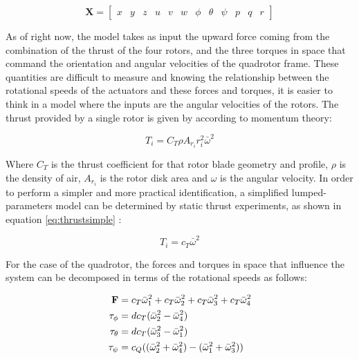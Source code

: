 \begin{equation} \label{eq:statevector}
\mathbf{X} = \begin{bmatrix} x & y & z & u & v & w & \phi & \theta & \psi & p & q & r \end{bmatrix}
\end{equation} 

As of right now, the model takes as input the upward force coming from the combination of the thrust of the four rotors, and the three torques in space that command the orientation and angular velocities of the quadrotor frame. These quantities are difficult to measure and knowing the relationship between the rotational speeds of the actuators and these forces and torques, it is easier to think in a model where the inputs are the angular velocities of the rotors. The thrust provided by a single rotor is given by \cite{MahoneyKumarCorke2012} according to momentum theory:

\begin{equation} \label{eq:rotorthrust}
T_i = C_T\rho A_{r_{i}}r_{i}^2 \bar{\omega}^2
\end{equation}	

Where $C_T$ is the thrust coefficient for that rotor blade geometry and profile, $\rho$ is the density of air, $A_{r_{i}}$ is the rotor disk area and $\omega$ is the angular velocity. In order to perform a simpler and more practical identification, a simplified lumped-parameters model can be determined by static thrust experiments, as shown in equation \ref{eq:thrustsimple} :

\begin{equation} \label{eq:thrustsimple}
T_i = c_T \bar{\omega}^2
\end{equation}

For the case of the quadrotor, the forces and torques in space that influence the system can be decomposed in terms of the rotational speeds as follows:

\begin{equation} \label{eq:thrust_aerodynamics}
\begin{subequations}
\begin{align}
	\mathbf{F} &= c_T\bar{\omega}_1^2 + c_T\bar{\omega}_2^2 + c_T\bar{\omega}_3^2 + c_T\bar{\omega}_4^2 \label{first}\\
	\mathbf{\tau_{\phi}} &= dc_T(\bar{\omega}_2^2 - \bar{\omega}_4^2) \label{second}\\
	\mathbf{\tau_{\theta}} &= dc_T(\bar{\omega}_3^2 - \bar{\omega}_1^2) \label{third}\\
	\mathbf{\tau_{\psi}} &= c_Q((\bar{\omega}_2^2 + \bar{\omega}_4^2) - (\bar{\omega}_1^2 + \bar{\omega}_3^2)) \label{fourth}
\end{align}
\end{subequations}
\end{equation}
	
